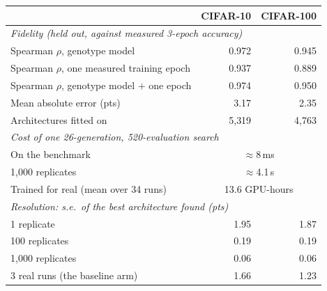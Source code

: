 \begin{tabular}{l rr}
\toprule
& \textbf{CIFAR-10} & \textbf{CIFAR-100} \\
\midrule
\multicolumn{3}{l}{\textit{Fidelity (held out, against measured 3-epoch accuracy)}} \\
Spearman $\rho$, genotype model & 0.972 & 0.945 \\
Spearman $\rho$, one measured training epoch & 0.937 & 0.889 \\
Spearman $\rho$, genotype model $+$ one epoch & 0.974 & 0.950 \\
Mean absolute error (pts) & 3.17 & 2.35 \\
Architectures fitted on & 5{,}319 & 4{,}763 \\
\midrule
\multicolumn{3}{l}{\textit{Cost of one 26-generation, 520-evaluation search}} \\
On the benchmark & \multicolumn{2}{c}{$\approx$8\,ms} \\
1{,}000 replicates & \multicolumn{2}{c}{$\approx$4.1\,s} \\
Trained for real (mean over 34 runs) & \multicolumn{2}{c}{13.6 GPU-hours} \\
\midrule
\multicolumn{3}{l}{\textit{Resolution: s.e.\ of the best architecture found (pts)}} \\
1 replicate & 1.95 & 1.87 \\
100 replicates & 0.19 & 0.19 \\
1{,}000 replicates & 0.06 & 0.06 \\
3 real runs (the baseline arm) & 1.66 & 1.23 \\
\bottomrule
\end{tabular}
